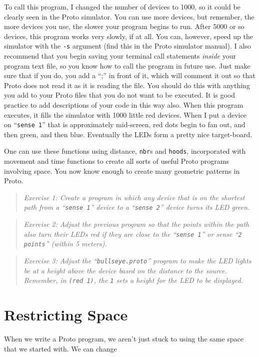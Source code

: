 \documentclass{article}
\newcommand\problem[1]{\begin{quote}{\em #1}\end{quote}}
\newcommand\var[1]{{\tt #1}}
\newcommand\qvar[1]{``{\tt #1}''}
\begin{document}
To call this program, I changed the number of devices to 1000, so it
could be clearly seen in the Proto simulator.  You can use more
devices, but remember, the more devices you use, the slower your
program begins to run.  After 5000 or so devices, this program works
very slowly, if at all.  You can, however, speed up the simulator with
the \var{-s} argument (find this in the Proto simulator manual).  I
also recommend that you begin saving your terminal call statements
{\em inside} your program text file, so you know how to call the
program in future use.  Just make sure that if you do, you add a “;”
in front of it, which will comment it out so that Proto does not read
it as it is reading the file.  You should do this with anything you
add to your Proto files that you do not want to be executed.  It is
good practice to add descriptions of your code in this way also.  When
this program executes, it fills the simulator with 1000 little red
devices.  When I put a device on \qvar{sense 1} that is approximately
mid-screen, red dots begin to fan out, and then green, and then blue.
Eventually the LEDs form a pretty nice target-board.

One can use these functions using distance, \var{nbr}s and
\var{hoods}, incorporated with movement and time functions to create
all sorts of useful Proto programs involving space.  You now know enough
to create many geometric patterns in Proto.

\problem{Exercise 1: Create a program in which any device that is on
  the shortest path from a \qvar{sense 1} device to a \qvar{sense 2}
  device turns its LED green.}

\problem{Exercise 2: Adjust the previous program so that the points
  within the path also turn their LEDs red if they are close to the
  \qvar{sense 1} or sense \qvar{2 points} (within 5 meters).}

\problem{Exercise 3: Adjust the \qvar{bullseye.proto} program to make
  the LED lights be at a height above the device based on the distance
  to the source. Remember, in \var{(red 1)}, the \var{1} sets a height
  for the LED to be displayed.}

\section{Restricting Space}
\label{s:mux}

When we write a Proto program, we aren't just stuck to using the same
space that we started with.  We can change 
\end{document}
